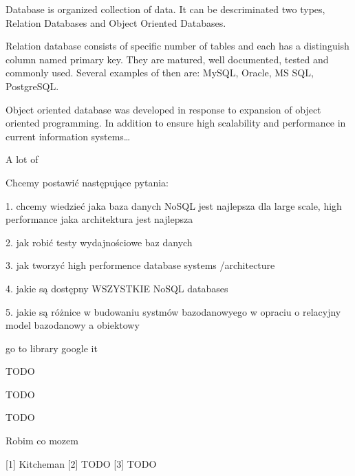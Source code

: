 \documentclass[times, 10pt,twocolumn]{article}
\begin{document}


Database is organized collection of data. It can be descriminated two types, 
Relation Databases and Object Oriented Databases.

Relation database consists of specific number of tables and each has a distinguish column named primary key. 
They are matured, well documented, tested and commonly used. Several examples of then are: MySQL, Oracle, MS SQL, PostgreSQL. 

Object oriented database was developed in response to expansion of object oriented programming. In addition to ensure high scalability and  
performance in current information systems\ldots

A lot of 


Chcemy postawić następujące pytania:

1. chcemy wiedzieć jaka baza danych NoSQL jest najlepsza dla large scale, high performance
jaka architektura jest najlepsza

2. jak robić testy wydajnościowe baz danych

3. jak tworzyć high performence database systems /architecture

4. jakie są dostępny WSZYSTKIE NoSQL databases

5. jakie są różnice w budowaniu systmów bazodanowyego w opraciu o relacyjny model bazodanowy a obiektowy



go to library
google it


TODO


TODO



TODO


Robim co mozem

[1] Kitcheman
[2] TODO
[3] TODO


\nocite{ex1,ex2}


\end{document}
